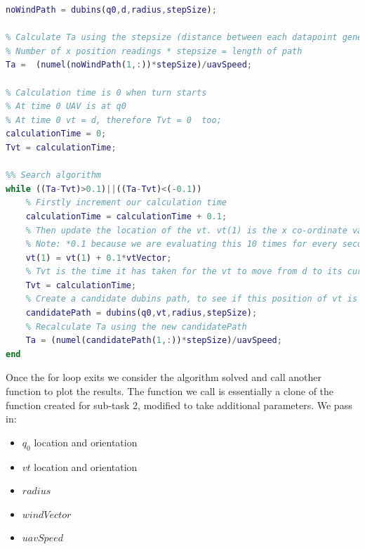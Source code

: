 \begin{minipage}{\linewidth}
\begin{lstlisting}[language=MATLAB]
% Ta starts as the time taken for the UAV to travel from q0 to d as if there was no wind, so
noWindPath = dubins(q0,d,radius,stepSize);

% Calculate Ta using the stepsize (distance between each datapoint generated by dubins function), and speed of uav.
% Number of x position readings * stepsize = length of path
Ta =  (numel(noWindPath(1,:))*stepSize)/uavSpeed; 

% Calculation time is 0 when turn starts
% At time 0 UAV is at q0
% At time 0 vt = d, therefore Tvt = 0  too;
calculationTime = 0;
Tvt = calculationTime;

%% Search algorithm
while ((Ta-Tvt)>0.1)||((Ta-Tvt)<(-0.1))
    % Firstly increment our calculation time
    calculationTime = calculationTime + 0.1;
    % Then update the location of the vt. vt(1) is the x co-ordinate value, this works because wind is always in only the x direction
    % Note: *0.1 because we are evaluating this 10 times for every second of calculationTime
    vt(1) = vt(1) + 0.1*vtVector;
    % Tvt is the time it has taken for the vt to move from d to its current location, so is equal to calculationTime
    Tvt = calculationTime;
    % Create a candidate dubins path, to see if this position of vt is a suitable solution for the search
    candidatePath = dubins(q0,vt,radius,stepSize);
    % Recalculate Ta using the new candidatePath
    Ta = (numel(candidatePath(1,:))*stepSize)/uavSpeed;
end
\end{lstlisting}
\end{minipage}

Once the for loop exits we consider the algorithm solved and call another function to plot the results. The function we call is essentially a clone of the function created for sub-task 2, modified to take additional parameters. We pass in:

\begin{itemize}
	\item $q_0$ location and orientation
	\item $vt$ location and orientation
	\item $radius$
	\item $windVector$
	\item $uavSpeed$
\end{itemize}

